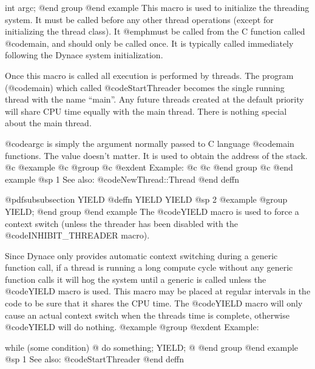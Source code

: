 int     argc;
@end group
@end example
This macro is used to initialize the threading system.  It must be
called before any other thread operations (except for initializing the
thread class).  It @emph{must} be called from the C function called
@code{main}, and should only be called once.  It is typically
called immediately following the Dynace system initialization.

Once this macro is called all execution is performed by threads.  The
program (@code{main}) which called @code{StartThreader} becomes the
single running thread with the name ``main''.  Any future threads
created at the default priority will share CPU time equally with the
main thread.  There is nothing special about the main thread.

@code{argc} is simply the argument normally passed to C language
@code{main} functions.  The value doesn't matter.  It is used to
obtain the address of the stack.
@c @example
@c @group
@c @exdent Example:
@c 
@c @end group
@c @end example
@sp 1
See also:  @code{NewThread::Thread}
@end deffn







@pdfsubsubsection {YIELD}
@deffn {YIELD} YIELD
@sp 2
@example
@group
YIELD;
@end group
@end example
The @code{YIELD} macro is used to force a context switch (unless the
threader has been disabled with the @code{INHIBIT_THREADER} macro).

Since Dynace only provides automatic context switching during a generic
function call, if a thread is running a long compute cycle without
any generic function calls it will hog the system until a generic is
called unless the @code{YIELD} macro is used.  This macro may be placed
at regular intervals in the code to be sure that it shares the CPU
time.  The @code{YIELD} macro will only cause an actual context
switch when the threads time is complete, otherwise @code{YIELD}
will do nothing.
@example
@group
@exdent Example:

while (some condition)  @{
        do something;
        YIELD;
@}
@end group
@end example
@sp 1
See also:  @code{StartThreader}
@end deffn










